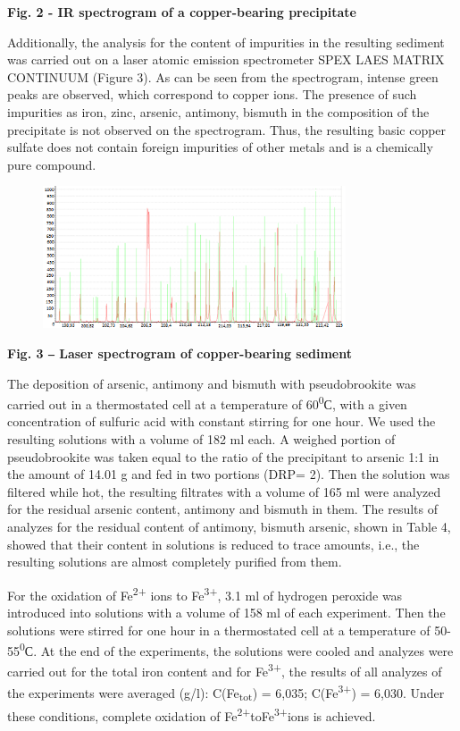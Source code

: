 {\bfseries Fig. 2 - IR spectrogram of a copper-bearing precipitate}

Additionally, the analysis for the content of impurities in the
resulting sediment was carried out on a laser atomic emission
spectrometer SPEX LAES MATRIX CONTINUUM (Figure 3). As can be seen from
the spectrogram, intense green peaks are observed, which correspond to
copper ions. The presence of such impurities as iron, zinc, arsenic,
antimony, bismuth in the composition of the precipitate is not observed
on the spectrogram. Thus, the resulting basic copper sulfate does not
contain foreign impurities of other metals and is a chemically pure
compound.

\begin{figure}[H]
	\centering
	\includegraphics[width=0.8\textwidth]{media/chem2/image19}
	\caption*{}
\end{figure}


{\bfseries Fig. 3 ‒ Laser spectrogram of copper-bearing sediment}

The deposition of arsenic, antimony and bismuth with pseudobrookite was
carried out in a thermostated cell at a temperature of
60\textsuperscript{0}С, with a given concentration of sulfuric acid with
constant stirring for one hour. We used the resulting solutions with a
volume of 182 ml each. A weighed portion of pseudobrookite was taken
equal to the ratio of the precipitant to arsenic 1:1 in the amount of
14.01 g and fed in two portions (DRP= 2). Then the solution was filtered
while hot, the resulting filtrates with a volume of 165 ml were analyzed
for the residual arsenic content, antimony and bismuth in them. The
results of analyzes for the residual content of antimony, bismuth
arsenic, shown in Table 4, showed that their content in solutions is
reduced to trace amounts, i.e., the resulting solutions are almost
completely purified from them.

For the oxidation of Fe\textsuperscript{2+} ions to
Fe\textsuperscript{3+}, 3.1 ml of hydrogen peroxide was introduced into
solutions with a volume of 158 ml of each experiment. Then the solutions
were stirred for one hour in a thermostated cell at a temperature of
50-55\textsuperscript{0}С. At the end of the experiments, the solutions
were cooled and analyzes were carried out for the total iron content and
for Fe\textsuperscript{3+}, the results of all analyzes of the
experiments were averaged (g/l): C(Fe\textsubscript{tot}) = 6,035;
C(Fe\textsuperscript{3+}) = 6,030. Under these conditions, complete
oxidation of Fe\textsuperscript{2+}toFe\textsuperscript{3+}ions is
achieved.

